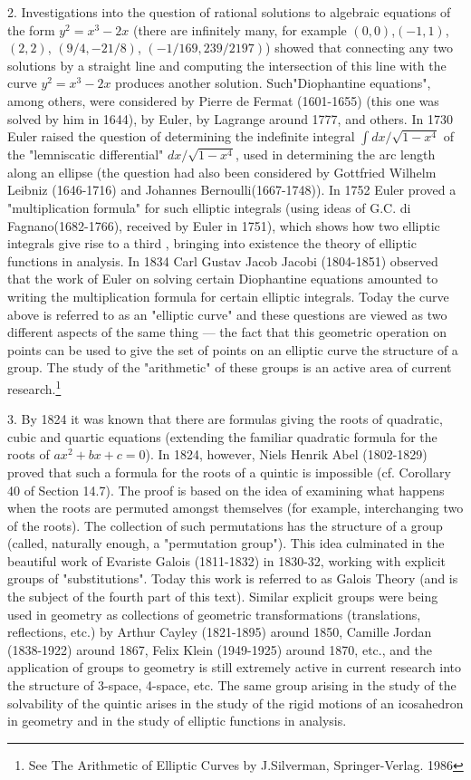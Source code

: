 \documentclass[cn,11pt,chinese]{elegantbook}
\numberwithin{equation}{section}
\begin{document}
2. Investigations into the question of rational solutions to algebraic equations of the form $y^2 = x^3 -2x$ (there are infinitely many, for example $(0, 0)$,$(-1,1)$, $(2,2)$, $(9/4, -21/8)$, $(-1/169, 239/2197)$) showed that connecting any two solutions by a straight line and computing the intersection of this line with the curve $y^2 = x^3 -2x$ produces another solution. Such"Diophantine equations", among others, were considered by Pierre de Fermat (1601-1655) (this one was solved by him in 1644), by Euler, by Lagrange around 1777, and others. In 1730 Euler raised the question of determining the indefinite integral $\int{dx/\sqrt{1-x^4}}$ of the "lemniscatic differential" $dx/\sqrt{1-x^4}$, used in determining the arc length along an ellipse (the question had also been considered by Gottfried Wilhelm Leibniz (1646-1716) and Johannes Bernoulli(1667-1748)). In 1752 Euler proved a "multiplication formula" for such elliptic integrals (using ideas of G.C. di Fagnano(1682-1766), received by Euler in 1751), which shows how two elliptic integrals give rise to a third , bringing into existence the theory of elliptic functions in analysis. In 1834 Carl Gustav Jacob Jacobi (1804-1851) observed that the work of Euler on solving certain Diophantine equations amounted to writing the multiplication formula for certain elliptic integrals. Today the curve above is referred to as an "elliptic curve" and these questions are viewed as two different aspects of the same thing --- the fact that this geometric operation on points can be used to give the set of points on an elliptic curve the structure of a group. The study of the "arithmetic" of these groups is an active area of current research.\footnote{See The Arithmetic of Elliptic Curves by J.Silverman, Springer-Verlag. 1986}

3. By 1824 it was known that there are formulas giving the roots of quadratic, cubic and quartic equations (extending the familiar quadratic formula for the roots of $ax^2+bx+c=0$). In 1824, however, Niels Henrik Abel (1802-1829) proved that such a formula for the roots of a quintic is impossible (cf. Corollary 40 of Section 14.7). The proof is based on the idea of examining what happens when the roots are permuted amongst themselves (for example, interchanging two of the roots). The collection of such permutations has the structure of a group (called, naturally enough, a "permutation group"). This idea culminated in the beautiful work of Evariste Galois (1811-1832) in 1830-32, working with explicit groups of "substitutions". Today this work is referred to as Galois Theory (and is the subject of the fourth part of this text). Similar explicit groups were being used in geometry as collections of geometric transformations (translations, reflections, etc.) by Arthur Cayley (1821-1895) around 1850, Camille Jordan (1838-1922) around 1867, Felix Klein (1949-1925) around 1870, etc., and the application of groups to geometry is still extremely active in current research into the structure of 3-space, 4-space, etc. The same group arising in the study of the solvability of the quintic arises in the study of the rigid motions of an icosahedron in geometry and in the study of elliptic functions in analysis.
\end{document}
